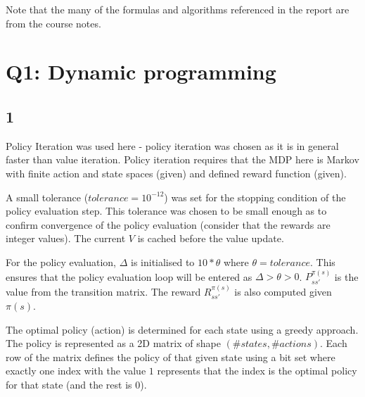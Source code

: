 
Note that the many of the formulas and algorithms referenced in the 
report are from the course notes.

\section*{Q1: Dynamic programming}
\subsection*{1}
Policy Iteration was used here - policy iteration was chosen as 
it is in general faster than value iteration. Policy iteration 
requires that the MDP here is Markov with finite
action and state spaces (given) and defined reward function (given).

A small tolerance ($tolerance = 10^{-12}$) was set for the 
stopping condition of the policy evaluation step. This 
tolerance was chosen to be small enough as to confirm convergence 
of the policy evaluation (consider that the rewards are integer 
values).
The current $V$ is cached before the value update.  


For the policy evaluation, $\Delta$ is initialised to $10 * \theta$ 
where $\theta = tolerance$. This ensures that the policy evaluation
loop will be entered as $\Delta > \theta > 0$. 
$P^{\pi(s)}_{s s'}$ is the value from the transition matrix. 
The reward $R^{\pi(s)}_{s s'}$ is also computed given $\pi(s)$.

The optimal policy (action) is determined for each state using a 
greedy approach. 
The policy is represented as a 2D matrix of shape 
$(\#states, \#actions)$. Each row of the matrix 
defines the policy of that given state using a bit set where 
exactly one index with the value $1$ represents that the index is 
the optimal policy for that state (and the rest is $0$). 

